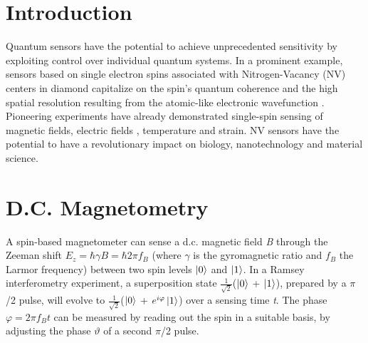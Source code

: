 \clearpage

\section{Introduction}
Quantum sensors have the potential to achieve unprecedented sensitivity by exploiting control over individual quantum systems\cite{Giovannetti_NatPhoton_2011,Higgins_Nature_2007}. In a prominent example, sensors based on single electron spins associated with Nitrogen-Vacancy (NV) centers in diamond capitalize on the spin's quantum coherence and the high spatial resolution resulting from the atomic-like electronic wavefunction \cite{Degen_APL_2008,Taylor_NatPhys_2008}. Pioneering experiments have already demonstrated single-spin sensing of magnetic fields\cite{Maze_Nature_2008,Balasubramanian_Nature_2008,Balasubramanian_NatMater_2009}, electric fields \cite{Dolde_NatPhys_2011}, temperature\cite{Acosta_Phys.Rev.Lett._2010,Toyli_PNAS_2013} and strain\cite{Ovartchaiyapong_NatCommun_2014}. NV sensors have the potential to have a revolutionary impact on biology\cite{LeSage_Nature_2013,Kaufmann_PNAS_2013,Kucsko_Nature_2013,Shi_Science_2015}, nanotechnology\cite{Maletinsky_NatNano_2012,Staudacher_Science_2013,Mamin_Science_2013} and material science\cite{Tetienne_Science_2014,Kolkowitz_Science_2015}. 

\section{D.C. Magnetometry}
A spin-based magnetometer can sense a d.c. magnetic field \textit{B} through the Zeeman shift $E_z=\hbar \gamma B = \hbar 2 \pi f_B$ (where $\gamma$ is the gyromagnetic ratio and $f_B$ the Larmor frequency) between two spin levels $\left|0\right>$ and $\left|1\right>$. In a Ramsey interferometry experiment, a superposition state  $\frac{1}{\sqrt{2}}$($\left|0\right>$ + $\left|1\right>$), prepared by a $\pi$/2 pulse, will evolve to $\frac{1}{\sqrt{2}}$($\left|0\right>$ + $e^{i\varphi}\left|1\right>$)   over a sensing time \textit{t}. The phase $\varphi = 2 \pi f_B t$ can be measured by reading out the spin in a suitable basis, by adjusting the phase $\vartheta$ of a second $\pi$/2 pulse.


